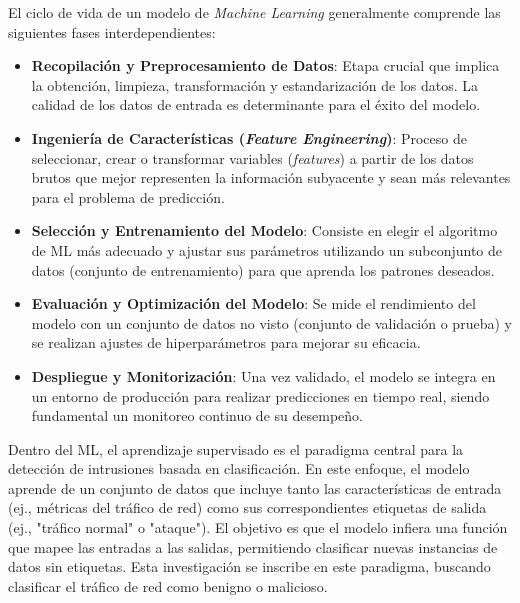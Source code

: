 El ciclo de vida de un modelo de \textit{Machine Learning} generalmente comprende las siguientes fases interdependientes:

\begin{itemize}
    
    \item\textbf{Recopilación y Preprocesamiento de Datos}: Etapa crucial que implica la obtención, limpieza, transformación y estandarización de los datos. La calidad de los datos de entrada es determinante para el éxito del modelo.
    
    \item\textbf{Ingeniería de Características (\textit{Feature Engineering})}: Proceso de seleccionar, crear o transformar variables (\textit{features}) a partir de los datos brutos que mejor representen la información subyacente y sean más relevantes para el problema de predicción.
    
    \item\textbf{Selección y Entrenamiento del Modelo}: Consiste en elegir el algoritmo de ML más adecuado y ajustar sus parámetros utilizando un subconjunto de datos (conjunto de entrenamiento) para que aprenda los patrones deseados.
    
    \item\textbf{Evaluación y Optimización del Modelo}: Se mide el rendimiento del modelo con un conjunto de datos no visto (conjunto de validación o prueba) y se realizan ajustes de hiperparámetros para mejorar su eficacia.
    
    \item\textbf{Despliegue y Monitorización}: Una vez validado, el modelo se integra en un entorno de producción para realizar predicciones en tiempo real, siendo fundamental un monitoreo continuo de su desempeño.

\end{itemize}

Dentro del ML, el aprendizaje supervisado es el paradigma central para la detección de intrusiones basada en clasificación. En este enfoque, el modelo aprende de un conjunto de datos que incluye tanto las características de entrada (ej., métricas del tráfico de red) como sus correspondientes etiquetas de salida (ej., "tráfico normal" o "ataque"). El objetivo es que el modelo infiera una función que mapee las entradas a las salidas, permitiendo clasificar nuevas instancias de datos sin etiquetas. Esta investigación se inscribe en este paradigma, buscando clasificar el tráfico de red como benigno o malicioso.

